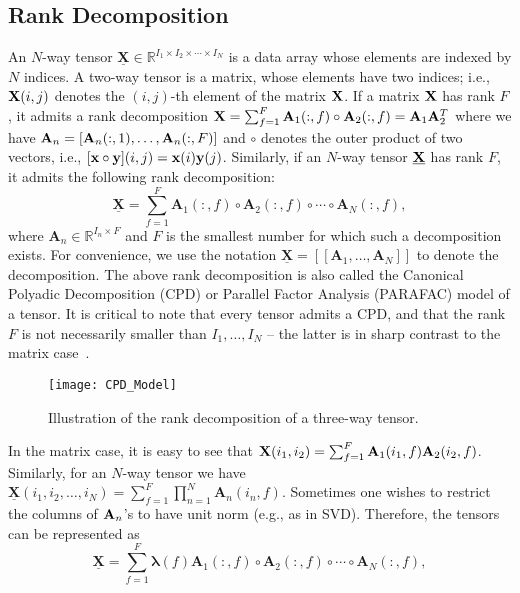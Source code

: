 \documentclass[journal]{IEEEtran}
\begin{document}
\subsection{Rank Decomposition}
An $N$-way tensor $\underline{\mathbf{X}} \in \mathbb{R}^{I_1 \times I_2 \times \cdots \times I_N}$ 
is a data array whose elements are indexed by $N$ indices. A {two-way} tensor is a matrix, whose elements have two indices; i.e., ${\bf X}(i,j)$ denotes the $(i,j)$-th element of the matrix ${\bf X}$. If a matrix ${\bf X}$ has rank $F$, it admits a rank decomposition ${\bf X}=\sum_{f=1}^F{\bf A}_1(:,f)\circ{\bf A}_2(:,f)= {\bf A}_1{\bf A}_2^T$
where we have ${\bf A}_n=[{\bf A}_n(:,1),\ldots,{\bf A}_n(:,F)]$ and $\circ$ denotes the outer product of two vectors, i.e.,
$[{\bf x}\circ {\bf y}](i,j)={\bf x}(i){\bf y}(j)$. Similarly, if an $N$-way tensor $\underline{\bf X}$ has rank $F$, it
admits the following rank decomposition:
\begin{equation}\label{eq:tensor_decomp}
\underline{\mathbf{X}} = \sum_{f=1}^F\mathbf{A}_1(:,f)\circ \mathbf{A}_2(:,f) \circ \cdots  \circ \mathbf{A}_N(:,f),
\end{equation}
where $\mathbf{A}_n \in \mathbb{R}^{I_n \times F}$ and $F$ is the smallest number for which such a decomposition exists. For convenience, we use the notation $\underline{\mathbf{X}} = [\![ \mathbf{A}_1,\ldots,\mathbf{A}_N ]\!]$ to denote the decomposition. 
The above rank decomposition is also called the Canonical Polyadic Decomposition (CPD) or Parallel Factor Analysis (PARAFAC) model of a tensor. 
It is critical to note that every tensor admits a {CPD}, and that the rank $F$ is not necessarily smaller than $I_1,\ldots,I_N$ -- the latter is in sharp contrast to the matrix case~\cite{SiDeFu2017}.
\begin{figure}
	\centering
	\texttt{[image: CPD\_Model]}
	\caption{Illustration of the rank decomposition of a {three-way} tensor.}
	\label{fig:cpd}
\end{figure}
In the matrix case, it is easy to see that ${\bf X}(i_1,i_2)=\sum_{f=1}^F  {\bf A}_1(i_1,f)\mathbf{A}_2(i_2,f)$.
Similarly, for an $N$-way tensor we have $\underline{\mathbf{X}}(i_1,i_2,\ldots,i_N) = \sum_{f=1}^F  \prod_{n=1}^N \mathbf{A}_n(i_n,f)$. Sometimes one wishes to restrict the columns of ${\bf A}_n$'s to have unit norm (e.g., as in SVD). Therefore, the tensors can be represented as
\begin{equation}\label{eq:tensor_decomp_norm}
\underline{\mathbf{X}} = \sum_{f=1}^F{\bm \lambda}(f)\mathbf{A}_1(:,f)\circ \mathbf{A}_2(:,f) \circ \cdots  \circ \mathbf{A}_N(:,f),
\end{equation}
\end{document}
